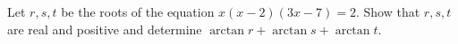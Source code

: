 Let $r,s,t$ be the roots of the equation $x(x-2)(3x-7)=2$. Show that $r,s,t$ are real and positive and determine $\arctan r+\arctan s +\arctan t$.